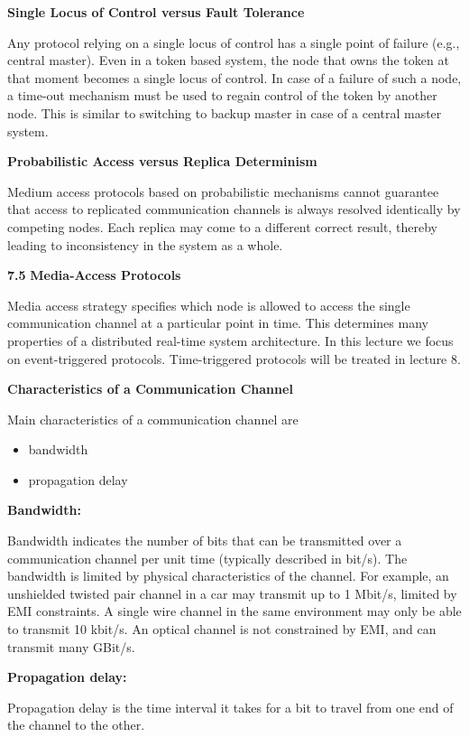 \textbf{Single Locus of Control versus Fault Tolerance}

Any protocol relying on a single locus of control has a single point of
failure (e.g., central master). Even in a token based system, the node
that owns the token at that moment becomes a single locus of control. In
case of a failure of such a node, a time-out mechanism must be used to
regain control of the token by another node. This is similar to
switching to backup master in case of a central master system.

\textbf{Probabilistic Access versus Replica Determinism}

Medium access protocols based on probabilistic mechanisms cannot
guarantee that access to replicated communication channels is always
resolved identically by competing nodes. Each replica may come to a
different correct result, thereby leading to inconsistency in the system
as a whole.

\textbf{7.5} \protect\hypertarget{teil6}{}{}\textbf{Media-Access
Protocols}

Media access strategy specifies which node is allowed to access the
single communication channel at a particular point in time. This
determines many properties of a distributed real-time system
architecture. In this lecture we focus on event-triggered protocols.
Time-triggered protocols will be treated in lecture 8.

\textbf{Characteristics of a Communication Channel}

Main characteristics of a communication channel are

\begin{itemize}
\item
  bandwidth
\item
  propagation delay
\end{itemize}

\textbf{Bandwidth:}

Bandwidth indicates the number of bits that can be transmitted over a
communication channel per unit time (typically described in bit/s). The
bandwidth is limited by physical characteristics of the channel. For
example, an unshielded twisted pair channel in a car may transmit up to
1 Mbit/s, limited by EMI constraints. A single wire channel in the same
environment may only be able to transmit 10 kbit/s. An optical channel
is not constrained by EMI, and can transmit many GBit/s.

\textbf{Propagation delay:}

Propagation delay is the time interval it takes for a bit to travel from
one end of the channel to the other.

